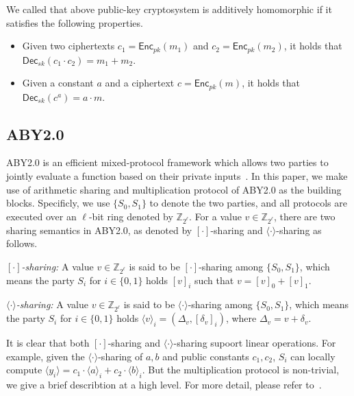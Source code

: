 \documentclass[conference]{IEEEtran}
\begin{document}
We called that above public-key cryptosystem is additively homomorphic if it satisfies the following properties.

\begin{itemize}
  \item Given two ciphertexts $c_1 = \mathsf{Enc}_{pk}(m_1)$ and $c_2 = \mathsf{Enc}_{pk}(m_2)$, it holds that $\mathsf{Dec}_{sk}(c_1 \cdot c_2) = m_1 + m_2$.
  \item Given a constant $a$ and a ciphertext $c=\mathsf{Enc}_{pk}(m)$, it holds that $\mathsf{Dec}_{sk}(c^a) = a\cdot m$.
\end{itemize}

\iffalse
\subsection{ABY2.0}

ABY2.0 is an efficient mixed-protocol framework which allows two parties to jointly evaluate a function based on their private inputs~\cite{patra_aby20_2020}.
In this paper, we make use of arithmetic sharing and multiplication protocol of ABY2.0 as the building blocks.
Specificly, we use $\{S_0, S_1\}$ to denote the two parties, and all protocols are executed over an $\ell$-bit ring denoted by $\mathbb{Z}_{2^\ell}$.
For a value $v\in\mathbb{Z}_{2^\ell}$, there are two sharing semantics in ABY2.0, as denoted by $[\cdot]$-sharing and $\langle \cdot \rangle$-sharing as follows.

\textit{$[\cdot]$-sharing:} A value $v\in\mathbb{Z}_{2^\ell}$ is said to be $[\cdot]$-sharing among $\{S_0, S_1\}$, which means the party $S_i$ for $i\in\{0,1\}$ holds $[v]_i$ such that $v = [v]_0 + [v]_1$.

\textit{$\langle \cdot \rangle$-sharing:} A value $v\in\mathbb{Z}_{2^\ell}$ is said to be $\langle \cdot \rangle$-sharing among $\{S_0, S_1\}$, which means the party $S_i$ for $i\in\{0,1\}$ holds $\langle v \rangle_i = (\Delta_v, [\delta_v]_i)$, where $\Delta_v = v + \delta_v$.

It is clear that both $[\cdot]$-sharing and $\langle \cdot \rangle$-sharing supoort linear operations.
For example, given the $\langle \cdot \rangle$-sharing of $a,b$ and public constants $c_1,c_2$, $S_i$ can locally compute $\langle y_i \rangle = c_1 \cdot \langle a \rangle_i + c_2 \cdot \langle b \rangle_i$.
But the multiplication protocol is non-trivial, we give a brief describtion at a high level.
For more detail, please refer to~\cite{patra_aby20_2020}.
\end{document}
